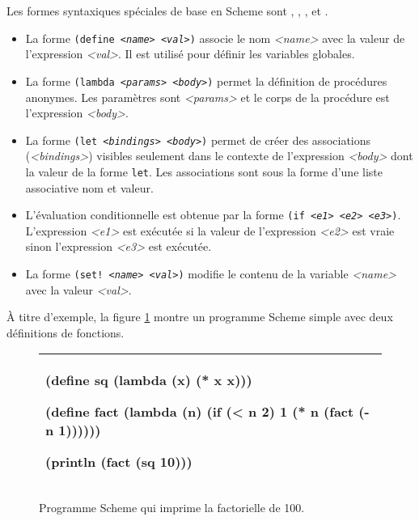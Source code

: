 Les formes syntaxiques spéciales de base en Scheme sont , ,
,  et .
\begin{itemize}
  \item La forme \texttt{(define \textit{<name>} \textit{<val>})} associe le nom \textit{<name>} avec
    la valeur de l'expression \textit{<val>}. Il est utilisé pour définir les variables globales.

  \item La forme \texttt{(lambda \textit{<params>} \textit{<body>})} permet la définition de
    procédures anonymes. Les paramètres sont \textit{<params>} et le corps
    de la procédure est l'expression \textit{<body>}.

  \item La forme \texttt{(let \textit{<bindings>} \textit{<body>})} permet de
    créer des associations (\textit{<bindings>}) visibles seulement dans le
    contexte de l'expression \textit{<body>} dont la valeur de la forme
    \texttt{let}. Les associations sont sous la forme d'une liste associative
    nom et valeur.

  \item L'évaluation conditionnelle est obtenue par la forme \texttt{(if
    \textit{<e1>} \textit{<e2>} \textit{<e3>})}.  L'expression \textit{<e1>}
    est exécutée si la valeur de l'expression \textit{<e2>} est vraie sinon
    l'expression \textit{<e3>} est exécutée.

  \item La forme \texttt{(set! \textit{<name>} \textit{<val>})} modifie le contenu de la variable
    \textit{<name>} avec la valeur \textit{<val>}.
\end{itemize}

À titre d'exemple, la figure \ref{fig:fact100} montre un programme Scheme
simple avec deux définitions de fonctions.
\begin{figure}[htbp]
  \begin{tabular}{|l|}\hline
\begin{mplisting}{0.7}
(define sq (lambda (x) (* x x)))

(define fact
  (lambda (n)
    (if (< n 2)
        1
        (* n (fact (- n 1))))))

(println (fact (sq 10)))
\end{mplisting}\\\hline
\end{tabular}

\caption{Programme Scheme qui imprime la factorielle de 100.}

\label{fig:fact100}
\end{figure}


